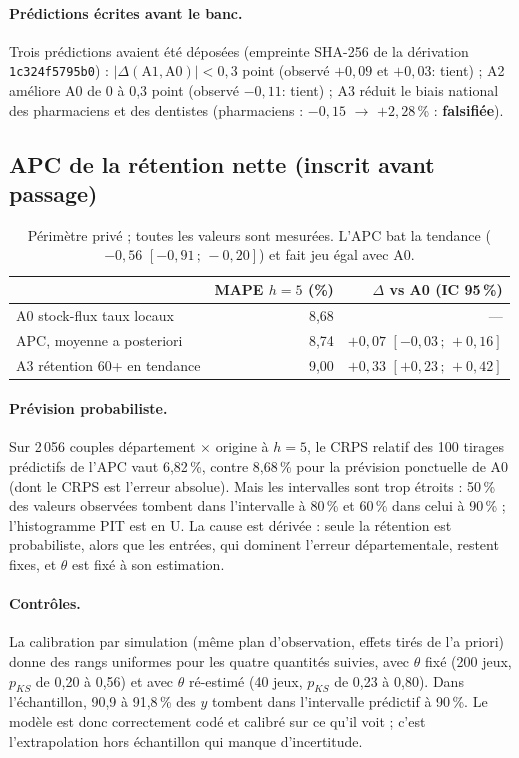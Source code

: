 \paragraph{Prédictions écrites avant le banc.} Trois prédictions avaient été déposées
(empreinte SHA-256 de la dérivation \texttt{1c324f5795b0}) :
$|\Delta(\text{A1}, \text{A0})| < 0{,}3$ point (observé $+0{,}09$ et $+0{,}03$\mesure : tient) ;
A2 améliore A0 de 0 à 0,3 point (observé $-0{,}11$\mesure : tient) ;
A3 réduit le biais national des pharmaciens et des dentistes (pharmaciens : $-0{,}15$ $\to$
$+2{,}28$\,\%\mesure{} : \textbf{falsifiée}).

\subsection{APC de la rétention nette (inscrit avant passage)}
\begin{table}[h]
\centering\small
\begin{tabular}{@{}lrr@{}}
\toprule
& MAPE $h=5$ (\%) & $\Delta$ vs A0 (IC 95\,\%) \\
\midrule
A0 stock-flux taux locaux & 8,68 & --- \\
APC, moyenne a posteriori & 8,74 & $+0{,}07$ $[-0{,}03\,;\,+0{,}16]$ \\
A3 rétention 60+ en tendance & 9,00 & $+0{,}33$ $[+0{,}23\,;\,+0{,}42]$ \\
\bottomrule
\end{tabular}
\caption{Périmètre privé ; toutes les valeurs sont mesurées\mesure. L'APC bat la tendance
($-0{,}56$ $[-0{,}91\,;\,-0{,}20]$\mesure) et fait jeu égal avec A0.}
\end{table}

\paragraph{Prévision probabiliste.} Sur 2\,056 couples département $\times$ origine à $h = 5$, le CRPS
relatif des 100 tirages prédictifs de l'APC vaut 6,82\,\%\mesure, contre 8,68\,\%\mesure{} pour la
prévision ponctuelle de A0 (dont le CRPS est l'erreur absolue). Mais les intervalles sont trop
étroits : 50\,\%\mesure{} des valeurs observées tombent dans l'intervalle à 80\,\% et 60\,\%\mesure{}
dans celui à 90\,\% ; l'histogramme PIT est en U. La cause est dérivée\derive{} : seule la rétention
est probabiliste, alors que les entrées, qui dominent l'erreur départementale, restent fixes, et
$\theta$ est fixé à son estimation.

\paragraph{Contrôles.} La calibration par simulation (même plan d'observation, effets tirés de l'a
priori) donne des rangs uniformes pour les quatre quantités suivies, avec $\theta$ fixé (200 jeux,
$p_{KS}$ de 0,20 à 0,56\mesure) et avec $\theta$ ré-estimé (40 jeux, $p_{KS}$ de 0,23 à
0,80\mesure). Dans l'échantillon, 90,9 à 91,8\,\%\mesure{} des $y$ tombent dans l'intervalle
prédictif à 90\,\%. Le modèle est donc correctement codé et calibré sur ce qu'il voit ; c'est
l'extrapolation hors échantillon qui manque d'incertitude.

